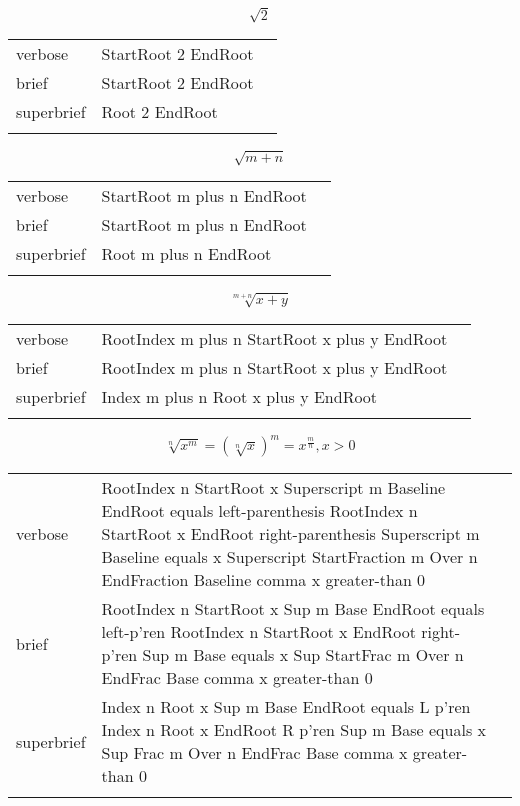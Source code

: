 
\label{sec:radicals}

\R
\E \[\sqrt{2}\]
\begin{longtable}[c]{@{}lll@{}}
\toprule\addlinespace
verbose & StartRoot 2 EndRoot &

\\\addlinespace
brief & StartRoot 2 EndRoot &

\\\addlinespace
superbrief & Root 2 EndRoot &

\\\addlinespace
\bottomrule
\end{longtable}


\E \[\sqrt{m+n}\]
\begin{longtable}[c]{@{}lll@{}}
\toprule\addlinespace
verbose & StartRoot m plus n EndRoot &

\\\addlinespace
brief & StartRoot m plus n EndRoot &

\\\addlinespace
superbrief & Root m plus n EndRoot &

\\\addlinespace
\bottomrule
\end{longtable}


\R
\E \[\sqrt[m+n]{x+y}\]
\begin{longtable}[c]{@{}lll@{}}
\toprule\addlinespace
verbose & RootIndex m plus n StartRoot x plus y EndRoot &

\\\addlinespace
brief & RootIndex m plus n StartRoot x plus y EndRoot &

\\\addlinespace
superbrief & Index m plus n Root x plus y EndRoot &

\\\addlinespace
\bottomrule
\end{longtable}


\E \[\sqrt[n]{x^m}=\left(\sqrt[n]{x}\right)^m=x^{\frac{m}{n}}, x>0\]
\begin{longtable}[c]{@{}lll@{}}
\toprule\addlinespace
verbose & RootIndex n StartRoot x Superscript m Baseline EndRoot equals
left-parenthesis RootIndex n StartRoot x EndRoot right-parenthesis
Superscript m Baseline equals x Superscript StartFraction m Over n
EndFraction Baseline comma x greater-than 0 &

\\\addlinespace
brief & RootIndex n StartRoot x Sup m Base EndRoot equals left-p'ren
RootIndex n StartRoot x EndRoot right-p'ren Sup m Base equals x Sup
StartFrac m Over n EndFrac Base comma x greater-than 0 &

\\\addlinespace
superbrief & Index n Root x Sup m Base EndRoot equals L p'ren Index n
Root x EndRoot R p'ren Sup m Base equals x Sup Frac m Over n EndFrac
Base comma x greater-than 0 &

\\\addlinespace
\bottomrule
\end{longtable}


